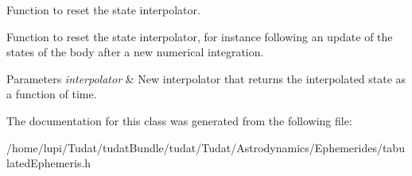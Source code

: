 Function to reset the state interpolator. 

Function to reset the state interpolator, for instance following an update of the states of the body after a new numerical integration. 
\begin{DoxyParams}{Parameters}
{\em interpolator} & New interpolator that returns the interpolated state as a function of time. \\
\hline
\end{DoxyParams}


The documentation for this class was generated from the following file\+:\begin{DoxyCompactItemize}
\item 
/home/lupi/\+Tudat/tudat\+Bundle/tudat/\+Tudat/\+Astrodynamics/\+Ephemerides/tabulated\+Ephemeris.\+h\end{DoxyCompactItemize}
